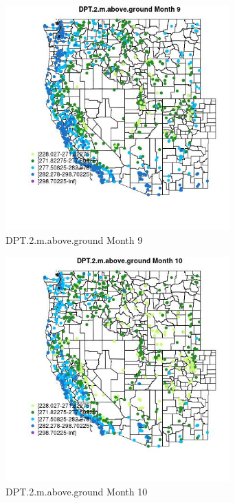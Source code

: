 \begin{figure} 
\centering  
\includegraphics[width=0.77\textwidth]{Code_Outputs/Report_ML_input_PM25_Step4_part_f_de_duplicated_aveswNAs_MapObsMo9DPT2maboveground.jpg} 
\caption{\label{fig:Report_ML_input_PM25_Step4_part_f_de_duplicated_aveswNAsMapObsMo9DPT2maboveground}DPT.2.m.above.ground Month 9} 
\end{figure} 
 

\begin{figure} 
\centering  
\includegraphics[width=0.77\textwidth]{Code_Outputs/Report_ML_input_PM25_Step4_part_f_de_duplicated_aveswNAs_MapObsMo10DPT2maboveground.jpg} 
\caption{\label{fig:Report_ML_input_PM25_Step4_part_f_de_duplicated_aveswNAsMapObsMo10DPT2maboveground}DPT.2.m.above.ground Month 10} 
\end{figure} 
 

